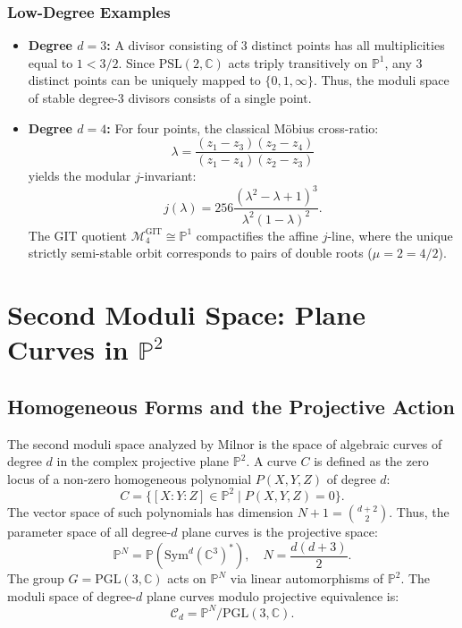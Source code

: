 \documentclass[11pt,a4paper]{article}
\begin{document}
\subsubsection{Low-Degree Examples}
\begin{itemize}
    \item \textbf{Degree $d = 3$:} A divisor consisting of 3 distinct points has all multiplicities equal to $1 < 3/2$. Since $\mathrm{PSL}(2, \mathbb{C})$ acts triply transitively on $\mathbb{P}^1$, any 3 distinct points can be uniquely mapped to $\{0, 1, \infty\}$. Thus, the moduli space of stable degree-3 divisors consists of a single point.
    \item \textbf{Degree $d = 4$:} For four points, the classical M\"obius cross-ratio:
    \begin{equation}
    \lambda = \frac{(z_1 - z_3)(z_2 - z_4)}{(z_1 - z_4)(z_2 - z_3)}
    \end{equation}
    yields the modular $j$-invariant:
    \begin{equation}
    j(\lambda) = 256 \frac{(\lambda^2 - \lambda + 1)^3}{\lambda^2(1 - \lambda)^2}.
    \end{equation}
    The GIT quotient $\mathcal{M}_4^{\mathrm{GIT}} \cong \mathbb{P}^1$ compactifies the affine $j$-line, where the unique strictly semi-stable orbit corresponds to pairs of double roots ($\mu = 2 = 4/2$).
\end{itemize}

\section{Second Moduli Space: Plane Curves in $\mathbb{P}^2$}

\subsection{Homogeneous Forms and the Projective Action}
The second moduli space analyzed by Milnor is the space of algebraic curves of degree $d$ in the complex projective plane $\mathbb{P}^2$. A curve $C$ is defined as the zero locus of a non-zero homogeneous polynomial $P(X, Y, Z)$ of degree $d$:
\begin{equation}
C = \{[X : Y : Z] \in \mathbb{P}^2 \mid P(X, Y, Z) = 0\}.
\end{equation}
The vector space of such polynomials has dimension $N+1 = \binom{d+2}{2}$. Thus, the parameter space of all degree-$d$ plane curves is the projective space:
\begin{equation}
\mathbb{P}^N = \mathbb{P}\left(\mathrm{Sym}^d(\mathbb{C}^3)^*\right), \quad N = \frac{d(d+3)}{2}.
\end{equation}
The group $G = \mathrm{PGL}(3, \mathbb{C})$ acts on $\mathbb{P}^N$ via linear automorphisms of $\mathbb{P}^2$. The moduli space of degree-$d$ plane curves modulo projective equivalence is:
\begin{equation}
\mathcal{C}_d = \mathbb{P}^N / \mathrm{PGL}(3, \mathbb{C}).
\end{equation}
\end{document}

